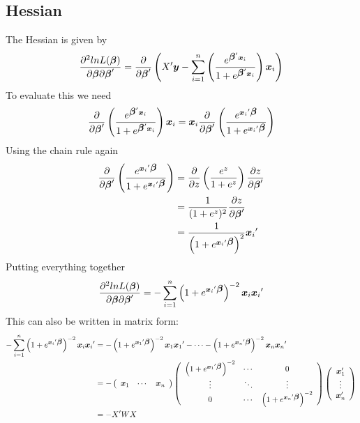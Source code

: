 \documentclass{article}
\newcommand{\bbeta}{\mbox{\boldmath $\beta$}}
\begin{document}
\subsection*{Hessian}
The Hessian is given by
\begin{equation}
\frac{\partial^2 lnL(\bbeta)}{\partial\bbeta\partial\bbeta'}=\frac{\partial}{\partial\bbeta'}\left(X'{\bm y}-\sum_{i=1}^{n}\left(
\frac{e^{\bbeta'{\bm x_i}}}{1+e^{\bbeta'{\bm x_i}}}
\right){\bm x_i}\right)
\end{equation}
To evaluate this we need
\begin{equation}
\frac{\partial}{\partial\bbeta'}\left(\frac{e^{\bbeta'{\bm x_i}}}{1+e^{\bbeta'{\bm x_i}}}
\right){\bm x_i}={\bm x_i}\frac{\partial}{\partial\bbeta'}\left(\frac{e^{{\bm x_i}'\bbeta}}{1+e^{{\bm x_i}'\bbeta}}
\right)
\end{equation}
Using the chain rule again
\begin{align}
\frac{\partial}{\partial\bbeta'}\left(\frac{e^{{\bm x_i}'\bbeta}}{1+e^{{\bm x_i}'\bbeta}}
\right)&=\frac{\partial}{\partial z}\left(\frac{e^z}{1+e^{z}}
\right)\frac{\partial z}{\partial\bbeta'}\\
&=\frac{1}{(1+e^{z})^2}\frac{\partial z}{\partial\bbeta'}\\
&=\frac{1}{\left(1+e^{{\bm x_i}'\bbeta}\right)^2}{\bm x_i}'
\end{align}
Putting everything together
\begin{equation}
\frac{\partial^2 lnL(\bbeta)}{\partial\bbeta\partial\bbeta'}=-\sum_{i=1}^{n} \left(1+e^{{\bm x_i}'\bbeta}\right)^{-2}{\bm x_i}{\bm x_i}'
\end{equation}
This can also be written in matrix form:
\begin{align*}
-\sum_{i=1}^{n} \left(1+e^{{\bm x_i}'\bbeta}\right)^{-2}{\bm x_i}{\bm x_i}'&=
-\left(1+e^{{\bm x_1}'\bbeta}\right)^{-2}{\bm x_1}{\bm x_1}'
-\cdots
-\left(1+e^{{\bm x_n}'\bbeta}\right)^{-2}{\bm x_n}{\bm x_n}'\\
&=-\left(
\begin{array}{ccc}
{\bm x_1} & \cdots & {\bm x_n}
\end{array}
\right)
\left(
\begin{array}{ccc}
\left(1+e^{{\bm x_1}'\bbeta}\right)^{-2} & \cdots & 0\\
\vdots & \ddots & \vdots\\
0 & \cdots & \left(1+e^{{\bm x_n}'\bbeta}\right)^{-2}
\end{array}
\right)
\left(
\begin{array}{c}
{\bm x'_1} \\ \vdots\\ {\bm x'_n}
\end{array}
\right)\\
&=-X'WX
\end{align*}
\end{document}
